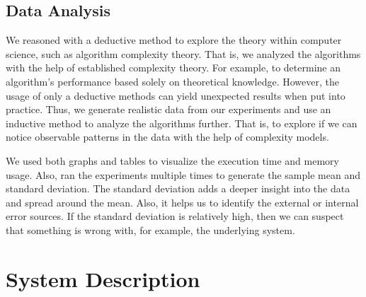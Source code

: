 \documentclass[a4paper,11pt]{kth-mag}
\newcommand*{\skippara}{\par\vspace{\baselineskip} \noindent}
\begin{document}
\subsection{Data Analysis}
We reasoned with a deductive method to explore the theory within computer science, such as algorithm complexity theory.
That is, we analyzed the algorithms with the help of established complexity theory.
For example, to determine an algorithm's performance based solely on theoretical knowledge.
However, the usage of only a deductive methods can yield unexpected results when put into practice.
Thus, we generate realistic data from our experiments and use an inductive method to analyze the algorithms further.
That is, to explore if we can notice observable patterns in the data with the help of complexity models.

\skippara We used both graphs and tables to visualize the execution time and memory usage.
Also, ran the experiments multiple times to generate the sample mean and standard deviation.
The standard deviation adds a deeper insight into the data and spread around the mean.
Also, it helps us to identify the external or internal error sources.
If the standard deviation is relatively high, then we can suspect that something is wrong with, for example, the underlying system.


\clearpage


\section{System Description}\label{section:system}


\end{document}
